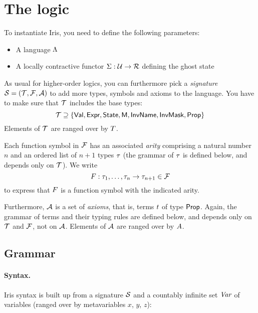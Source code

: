 \section{The logic}

To instantiate Iris, you need to define the following parameters:
\begin{itemize}
\item A language $\Lambda$
\item A locally contractive functor $\Sigma : \mathcal{U} \to \mathcal{R}$ defining the ghost state
\end{itemize}

\noindent
As usual for higher-order logics, you can furthermore pick a \emph{signature} $\mathcal{S} = (\mathcal{T}, \mathcal{F}, \mathcal{A})$ to add more types, symbols and axioms to the language.
You have to make sure that $\mathcal{T}$ includes the base types:
\[
	\mathcal{T} \supseteq \{ \textsf{Val}, \textsf{Expr}, \textsf{State}, \textsf{M}, \textsf{InvName}, \textsf{InvMask}, \textsf{Prop} \}
\]
Elements of $\mathcal{T}$ are ranged over by $T$.

Each function symbol in $\mathcal{F}$ has an associated \emph{arity} comprising a natural number $n$ and an ordered list of $n+1$ types $\tau$ (the grammar of $\tau$ is defined below, and depends only on $\mathcal{T}$).
We write
\[
	F : \tau_1, \dots, \tau_n \to \tau_{n+1} \in \mathcal{F}
\]
to express that $F$ is a function symbol with the indicated arity.

Furthermore, $\mathcal{A}$ is a set of \emph{axioms}, that is, terms $t$ of type $\textsf{Prop}$.
Again, the grammar of terms and their typing rules are defined below, and depends only on $\mathcal{T}$ and $\mathcal{F}$, not on $\mathcal{A}$.
Elements of $\mathcal{A}$ are ranged over by $A$.

\subsection{Grammar}\label{sec:grammar}

\paragraph{Syntax.}
Iris syntax is built up from a signature $\mathcal{S}$ and a countably infinite set $\textit{Var}$ of variables (ranged over by metavariables $x$, $y$, $z$):

